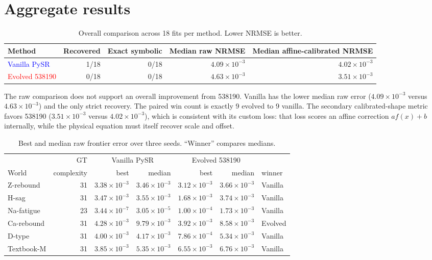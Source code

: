 \documentclass[10pt]{article}
\newcommand{\methodA}{\textcolor{blue}{Vanilla PySR}}
\newcommand{\methodB}{\textcolor{red}{Evolved 538190}}
\begin{document}
\section{Aggregate results}

\begin{table}[h]
\centering
\caption{Overall comparison across 18 fits per method. Lower NRMSE is better.}
\begin{tabular}{lrrrr}
\toprule
Method & Recovered & Exact symbolic & Median raw NRMSE & Median affine-calibrated NRMSE \\
\midrule
\methodA & 1/18 & 0/18 & $4.09\!\times\!10^{-3}$ & $4.02\!\times\!10^{-3}$ \\
\methodB & 0/18 & 0/18 & $4.63\!\times\!10^{-3}$ & $3.51\!\times\!10^{-3}$ \\
\bottomrule
\end{tabular}
\end{table}

The raw comparison does not support an overall improvement from 538190. Vanilla has the lower
median raw error ($4.09\!\times\!10^{-3}$ versus $4.63\!\times\!10^{-3}$)
and the only strict recovery. The paired win count is exactly
9 evolved to 9 vanilla. The secondary calibrated-shape
metric favors 538190 ($3.51\!\times\!10^{-3}$ versus
$4.02\!\times\!10^{-3}$), which is consistent with its custom loss:
that loss scores an affine correction $a f(x)+b$ internally, while the physical equation must itself
recover scale and offset.

\begin{table}[h]
\centering
\caption{Best and median raw frontier error over three seeds. ``Winner'' compares medians.}
\small
\begin{tabular}{lrrrrrl}
\toprule
& GT & \multicolumn{2}{c}{Vanilla PySR} & \multicolumn{2}{c}{Evolved 538190} & \\
\cmidrule(lr){3-4}\cmidrule(lr){5-6}
World & complexity & best & median & best & median & winner \\
\midrule
Z-rebound & 31 & $3.38\!\times\!10^{-3}$ & $3.46\!\times\!10^{-3}$ & $3.12\!\times\!10^{-3}$ & $3.66\!\times\!10^{-3}$ & Vanilla \\
H-sag & 31 & $3.47\!\times\!10^{-3}$ & $3.55\!\times\!10^{-3}$ & $1.68\!\times\!10^{-3}$ & $3.74\!\times\!10^{-3}$ & Vanilla \\
Na-fatigue & 23 & $3.44\!\times\!10^{-7}$ & $3.05\!\times\!10^{-5}$ & $1.00\!\times\!10^{-4}$ & $1.73\!\times\!10^{-3}$ & Vanilla \\
Ca-rebound & 31 & $4.28\!\times\!10^{-3}$ & $9.79\!\times\!10^{-3}$ & $3.92\!\times\!10^{-3}$ & $8.58\!\times\!10^{-3}$ & Evolved \\
D-type & 31 & $4.00\!\times\!10^{-3}$ & $4.17\!\times\!10^{-3}$ & $7.86\!\times\!10^{-4}$ & $5.34\!\times\!10^{-3}$ & Vanilla \\
Textbook-M & 31 & $3.85\!\times\!10^{-3}$ & $5.35\!\times\!10^{-3}$ & $6.55\!\times\!10^{-3}$ & $6.76\!\times\!10^{-3}$ & Vanilla \\
\bottomrule
\end{tabular}
\end{table}
\end{document}
